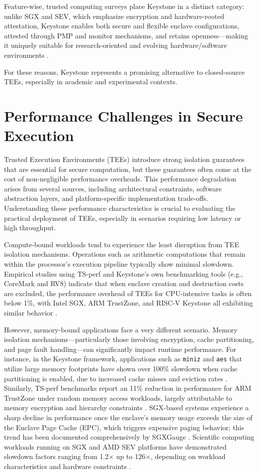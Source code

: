 Feature-wise, trusted computing surveys place Keystone in a distinct category: unlike SGX and SEV, which emphasize encryption and hardware-rooted attestation, Keystone enables both secure and flexible enclave configurations, attested through PMP and monitor mechanisms, and retains openness—making it uniquely suitable for research-oriented and evolving hardware/software environments \cite{turn0search9}.

For these reasons, Keystone represents a promising alternative to closed-source TEEs, especially in academic and experimental contexts.


\section{Performance Challenges in Secure Execution}

Trusted Execution Environments (TEEs) introduce strong isolation guarantees that are essential for secure computation, but these guarantees often come at the cost of non-negligible performance overheads. This performance degradation arises from several sources, including architectural constraints, software abstraction layers, and platform-specific implementation trade-offs. Understanding these performance characteristics is crucial to evaluating the practical deployment of TEEs, especially in scenarios requiring low latency or high throughput.

Compute-bound workloads tend to experience the least disruption from TEE isolation mechanisms. Operations such as arithmetic computations that remain within the processor’s execution pipeline typically show minimal slowdown. Empirical studies using TS-perf and Keystone’s own benchmarking tools (e.g., CoreMark and RV8) indicate that when enclave creation and destruction costs are excluded, the performance overhead of TEEs for CPU-intensive tasks is often below 1\%, with Intel SGX, ARM TrustZone, and RISC-V Keystone all exhibiting similar behavior \cite{Suzaki2021,dayeol2019keystone}.

However, memory-bound applications face a very different scenario. Memory isolation mechanisms—particularly those involving encryption, cache partitioning, and page fault handling—can significantly impact runtime performance. For instance, in the Keystone framework, applications such as \texttt{miniz} and \texttt{aes} that utilize large memory footprints have shown over 100\% slowdown when cache partitioning is enabled, due to increased cache misses and eviction rates \cite{dayeol2019keystone}. Similarly, TS-perf benchmarks report an 11\% reduction in performance for ARM TrustZone under random memory access workloads, largely attributable to memory encryption and hierarchy constraints \cite{Suzaki2021}. SGX-based systems experience a sharp decline in performance once the enclave's memory usage exceeds the size of the Enclave Page Cache (EPC), which triggers expensive paging behavior; this trend has been documented comprehensively by SGXGauge \cite{kumar2022sgxgauge}. Scientific computing workloads running on SGX and AMD SEV platforms have demonstrated slowdown factors ranging from 1.2× up to 126×, depending on workload characteristics and hardware constraints \cite{akkram2020scientific}.

